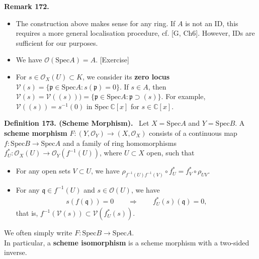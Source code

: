 \documentclass[12pt,a4paper,footinclude=true,headinclude=true]{scrbook} %
\newenvironment{definition}[2][Definition]
    { \begin{mdframed}[backgroundcolor=gray!20] \textbf{#1 #2.}\ }
    {  \end{mdframed}}
\newenvironment{remark}[2][Remark]
    { \begin{mdframed}[backgroundcolor=gray!20] \textbf{#1 #2.} }
    {  \end{mdframed}}
\begin{document}
\begin{remark}{172}
    \begin{itemize}
        \item[(a)] The construction above makes sense for any ring. If $A$ is not an ID, this requires a more general localisation procedure, cf. [G, Ch6]. However, IDs are sufficient for our purposes.
        \item[(b)] We have $\mathcal{O}(\mathrm{Spec}A)=A$. [Exercise]
        \item[(c)] For $s\in\mathcal{O}_X(U)\subset K$, we consider its \textbf{zero locus} $\mathcal{V}(s)=\{\mathfrak{p}\in\mathrm{Spec}A:s(\mathfrak{p})=0\}$. If $s\in A$, then $\mathcal{V}(s)=\mathcal{V}((s)))=\{\mathfrak{p}\in\mathrm{Spec}A: \mathfrak{p}\supset(s)\}$. For example, $\mathcal{V}((s))=s^{-1}(0)$ in $\mathrm{Spec}\ \mathbb{C}[x]$ for $s\in\mathbb{C}[x]$.
    \end{itemize}
\end{remark}
\newpage
\begin{definition}{173. (Scheme Morphism)}
    \newline Let $X=\mathrm{Spec}A$ and $Y=\mathrm{Spec}B$. A \textbf{scheme morphism} $F:(Y,\mathcal{O}_Y)\to (X,\mathcal{O}_X)$ consists of a continuous map $f:\mathrm{Spec}B\to\mathrm{Spec}A$ and a family of ring homomorphisms $f_U^\ast:\mathcal{O}_X(U)\to\mathcal{O}_Y(f^{-1}(U))$, where $U\subset X$ open, such that 
    \begin{itemize}
        \item For any open sets $V\subset U$, we have $\rho_{f^{-1}(U)f^{-1}(V)} \circ f_U^\ast=f_V^\ast\circ\rho_{UV}$.
        \begin{center}
        \end{center}
        \item For any $\mathfrak{q}\in f^{-1}(U)$ and $s\in\mathcal{O}(U)$, we have
        \begin{align*}
            s(f(\mathfrak{q}))=0\qquad\Longrightarrow\qquad f_U^\ast(s)(\mathfrak{q})=0,
        \end{align*}
        that is, $f^{-1}(\mathcal{V}(s))\subset\mathcal{V}(f^\ast_U(s))$.
    \end{itemize}
    We often simply write $F:\mathrm{Spec}B\to\mathrm{Spec}A$.\\ In particular, a \textbf{scheme isomorphism} is a scheme morphism with a two-sided inverse.
\end{definition}
\end{document}
